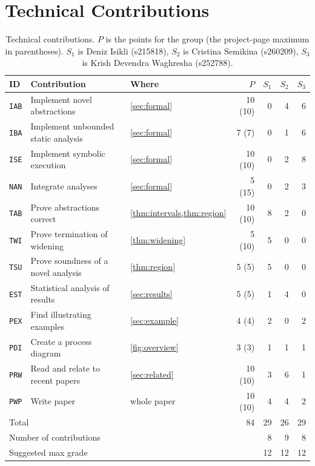 \section{Technical Contributions}
\label{app:contributions}

\begin{table}[h]
  \centering
  \caption{Technical contributions. $P$ is the points for the group (the project-page
  maximum in parentheses). $S_1$ is Deniz Isikli (s215818), $S_2$ is Cristina Semikina
  (s260209), $S_3$ is Krish Devendra Waghresha (s252788).}
  \label{tab:contributions}
  \small
  \begin{tabular}{@{}lllrrrr@{}} \toprule
    ID & Contribution & Where & $P$ & $S_1$ & $S_2$ & $S_3$ \\ \midrule
    \texttt{IAB} & Implement novel abstractions & \cref{sec:formal} & 10 (10) & 0 & 4 & 6 \\
    \texttt{IBA} & Implement unbounded static analysis & \cref{sec:formal} & 7 (7) & 0 & 1 & 6 \\
    \texttt{ISE} & Implement symbolic execution & \cref{sec:formal} & 10 (10) & 0 & 2 & 8 \\
    \texttt{NAN} & Integrate analyses & \cref{sec:formal} & 5 (15) & 0 & 2 & 3 \\
    \texttt{TAB} & Prove abstractions correct & \cref{thm:intervals,thm:region} & 10 (10) & 8 & 2 & 0 \\
    \texttt{TWI} & Prove termination of widening & \cref{thm:widening} & 5 (10) & 5 & 0 & 0 \\
    \texttt{TSU} & Prove soundness of a novel analysis & \cref{thm:region} & 5 (5) & 5 & 0 & 0 \\
    \texttt{EST} & Statistical analysis of results & \cref{sec:results} & 5 (5) & 1 & 4 & 0 \\
    \texttt{PEX} & Find illustrating examples & \cref{sec:example} & 4 (4) & 2 & 0 & 2 \\
    \texttt{PDI} & Create a process diagram & \cref{fig:overview} & 3 (3) & 1 & 1 & 1 \\
    \texttt{PRW} & Read and relate to recent papers & \cref{sec:related} & 10 (10) & 3 & 6 & 1 \\
    \texttt{PWP} & Write paper & whole paper & 10 (10) & 4 & 4 & 2 \\ \midrule
    \multicolumn{3}{l}{Total} & 84 & 29 & 26 & 29 \\
    \multicolumn{3}{l}{Number of contributions} & & 8 & 9 & 8 \\
    \multicolumn{3}{l}{Suggested max grade} & & 12 & 12 & 12 \\ \bottomrule
  \end{tabular}
\end{table}

